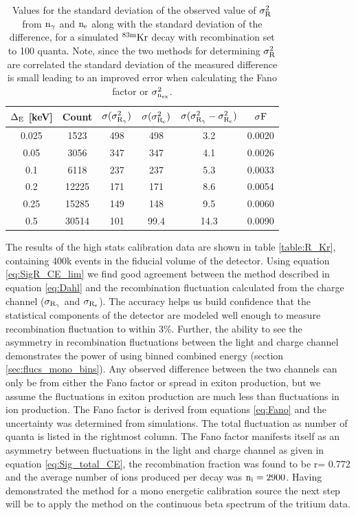 \begin{table}[h!]
\begin{center}
\tabcolsep=0.11cm
\begin{tabular}{|c|c|c|c|c|c|}
\hline
$\rm \Delta_E$ [keV] & Count & $\rm \sigma (\sigma_{R_{\gamma}}^2 ) $ & $\rm \sigma (\sigma_{R_{e}}^2 )$  & $\rm \sigma (\sigma_{R_{\gamma}}^2 - \sigma_{R_{e}}^2 ) $ & $\rm \sigma F$ \\ \hline
0.025 	& 1523		&498		& 498	  	& 3.2	&	 0.0020\\ \hline
0.05 	& 3056 		&347		& 347	  	& 4.1	&	 0.0026\\ \hline
0.1 		& 6118  	&237		& 237		& 5.3	&	 0.0033\\ \hline
0.2 		& 12225  	&171		& 171	 	& 8.6	&	 0.0054\\ \hline
0.25 	& 15285 	&149		& 148		& 9.5 	&	 0.0060\\ \hline
0.5		& 30514 	&101		& 99.4  		&14.3	&	 0.0090 \\ \hline
\end{tabular}
\caption{Values for the standard deviation of the observed value of $\rm \sigma_R^2$ from $\rm n_\gamma$ and $\rm n_e$ along with the standard deviation of the difference, for a simulated $\rm^{83m}Kr$ decay with recombination set to 100 quanta.  Note, since the two methods for determining $\rm \sigma_R^2$  are correlated the standard deviation of the measured difference is small leading to an improved error when calculating the Fano factor or $\rm \sigma_{n_{ex}}^2$.}
\label{table:Simulated_Sigmas_R_100}
\end{center}
\end{table}


The results of the high stats calibration data are shown in table \ref{table:R_Kr}, containing 400k events in the fiducial volume of the detector. Using equation \ref{eq:SigR_CE_lim} we find good agreement between the method described in equation \ref{eq:Dahl} and the recombination fluctuation calculated from the charge channel ($\rm \sigma_{R_\gamma}$ and $\rm \sigma_{R_e}$).  The accuracy helps us build confidence that the statistical components of the detector are modeled well enough to measure recombination fluctuation to within 3\%. Further, the ability to see the asymmetry in recombination fluctuations between the light and charge channel demonstrates the power of using binned combined energy (section \ref{sec:flucs_mono_bins}). Any observed difference between the two channels  can only be from either the Fano factor or spread in exiton production, but we assume the fluctuations in exiton production are much less than fluctuations in ion production. The Fano factor is derived from equations \ref{eq:Fano} and the uncertainty was determined from simulations. The total fluctuation as number of quanta is listed in the rightmost column. The Fano factor manifests itself as an asymmetry between fluctuations in the light and charge channel as given in equation \ref{eq:Sig_total_CE}, the recombination fraction was found to be r= 0.772 and the average number of ions produced per decay was $\rm n_i=2900$. 
Having demonstrated the method for a mono energetic calibration source the next step will be to apply the method on the continuous beta spectrum of the tritium data.



